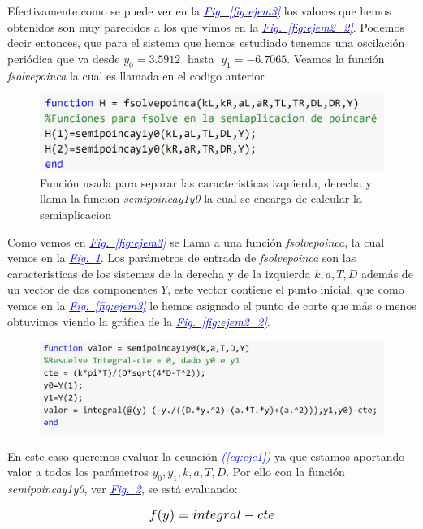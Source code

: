 \documentclass[12pt,a4paper]{report} %
\newcommand{\fref}[1]{\hyperref[#1]{\textcolor{blue}{\textit{Fig.~\ref*{#1}}}}}
\newcommand{\eref}[1]{\hyperref[#1]{\textcolor{blue}{\textit{(\ref*{#1})}}}}
\begin{document}
	Efectivamente como se puede ver en la \fref{fig:ejem3} los valores que hemos obtenidos son muy parecidos a los que vimos en la \fref{fig:ejem2_2}. Podemos decir entonces, que para el sistema que hemos estudiado tenemos una oscilación periódica que va desde $y_0=3.5912\;$ hasta $\; y_1=-6.7065$. Veamos la función \textit{fsolvepoinca} la cual es llamada en el codigo anterior
	\newpage
	\begin{figure}[h]
		\centering
		\includegraphics[width=1\textwidth]{ejem3_1.jpg}
		\caption{Función usada para separar las caracteristicas izquierda, derecha y llama la funcion \textit{semipoincay1y0} la cual se encarga de calcular la semiaplicacion}
		\label{fig:ejem3_1}
	\end{figure}\smallskip
	
	Como vemos en \fref{fig:ejem3} se llama a una función \textit{fsolvepoinca}, la cual vemos en la \fref{fig:ejem3_1}. Los parámetros de entrada de \textit{fsolvepoinca} son las caracteristicas de los sistemas de la derecha y de la izquierda $k,a,T,D$ además de un vector de dos componentes $Y$, este vector contiene el punto inicial, que como vemos en la \fref{fig:ejem3} le hemos asignado el punto de corte que más o menos obtuvimos viendo la gráfica de la \fref{fig:ejem2_2}.
	\vspace{0.5cm}
	\begin{figure}[h]
		\centering
		\includegraphics[width=1\textwidth]{ejem3_2.jpg}
		\caption{}
		\label{fig:ejem3_2}
	\end{figure}\smallskip
	
	En este caso queremos evaluar la ecuación \eref{eq:eje1} ya que estamos aportando valor a todos los parámetros $y_0,y_1,k,a,T,D$. Por ello con la función \textit{semipoincay1y0}, ver \fref{fig:ejem3_2}, se está evaluando:
	
	\begin{equation}
		\label{eq:eje4}
		\scalebox{1.2}{$\displaystyle
			f(y)=integral - cte
			$}
	\end{equation}\smallskip
	
\end{document}

